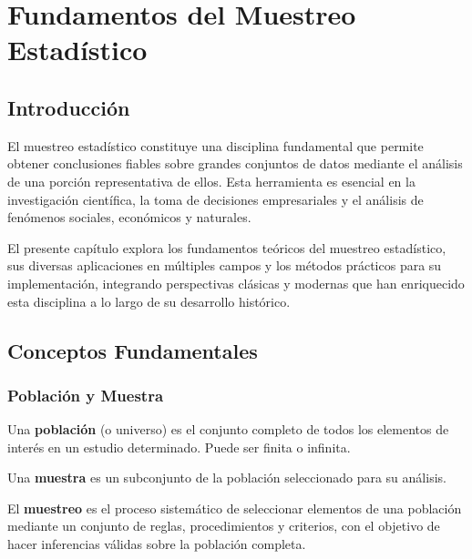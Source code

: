 \chapter{Fundamentos del Muestreo Estadístico}

\section{Introducción}

El muestreo estadístico constituye una disciplina fundamental que permite obtener conclusiones fiables sobre grandes conjuntos de datos mediante el análisis de una porción representativa de ellos. Esta herramienta es esencial en la investigación científica, la toma de decisiones empresariales y el análisis de fenómenos sociales, económicos y naturales.

El presente capítulo explora los fundamentos teóricos del muestreo estadístico, sus diversas aplicaciones en múltiples campos y los métodos prácticos para su implementación, integrando perspectivas clásicas y modernas que han enriquecido esta disciplina a lo largo de su desarrollo histórico.

\section{Conceptos Fundamentales}

\subsection{Población y Muestra}

\begin{definition}
Una \textbf{población} (o universo) es el conjunto completo de todos los elementos de interés en un estudio determinado. Puede ser finita o infinita.
\end{definition}

\begin{definition}
Una \textbf{muestra} es un subconjunto de la población seleccionado para su análisis.
\end{definition}

\begin{definition}
El \textbf{muestreo} es el proceso sistemático de seleccionar elementos de una población mediante un conjunto de reglas, procedimientos y criterios, con el objetivo de hacer inferencias válidas sobre la población completa.
\end{definition}

